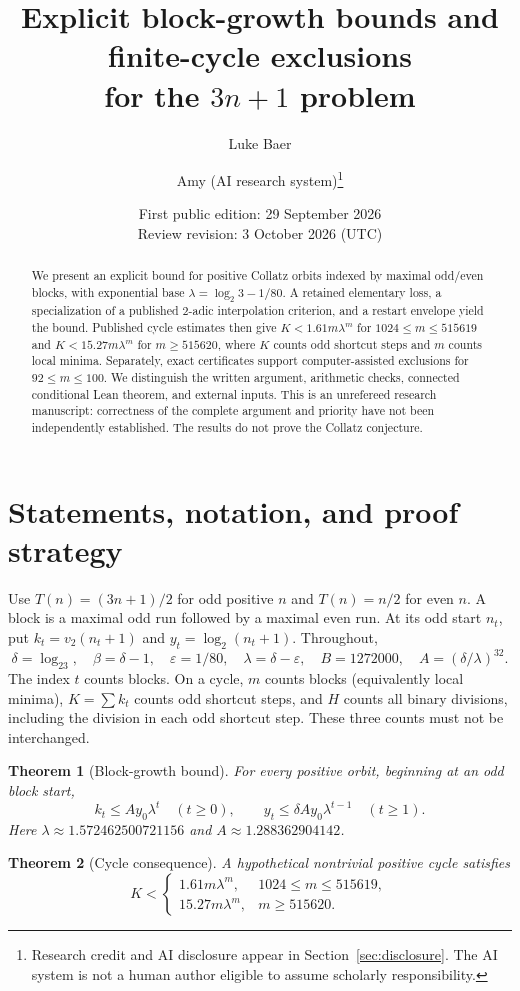 \documentclass[11pt]{article}
\title{Explicit block-growth bounds and finite-cycle exclusions\\for the $3n+1$ problem}
\author{Luke Baer \and Amy (AI research system)\thanks{Research credit and AI disclosure appear in Section~\ref{sec:disclosure}. The AI system is not a human author eligible to assume scholarly responsibility.}}
\date{First public edition: 29 September 2026\\Review revision: 3 October 2026 (UTC)}
\newtheorem{theorem}{Theorem}
\theoremstyle{definition}\newtheorem{definition}[theorem]{Definition}
\newcommand{\lb}{\log_2}
\newcommand{\eps}{\varepsilon}
\newcommand{\val}{v_2}
\begin{document}
\maketitle
\begin{abstract}
We present an explicit bound for positive Collatz orbits indexed by maximal odd/even blocks, with exponential base $\lambda=\log_2 3-1/80$. A retained elementary loss, a specialization of a published $2$-adic interpolation criterion, and a restart envelope yield the bound. Published cycle estimates then give $K<1.61m\lambda^m$ for $1024\le m\le515619$ and $K<15.27m\lambda^m$ for $m\ge515620$, where $K$ counts odd shortcut steps and $m$ counts local minima. Separately, exact certificates support computer-assisted exclusions for $92\le m\le100$. We distinguish the written argument, arithmetic checks, connected conditional Lean theorem, and external inputs. This is an unrefereed research manuscript: correctness of the complete argument and priority have not been independently established. The results do not prove the Collatz conjecture.
\end{abstract}

\section{Statements, notation, and proof strategy}
Use $T(n)=(3n+1)/2$ for odd positive $n$ and $T(n)=n/2$ for even $n$. A block is a maximal odd run followed by a maximal even run. At its odd start $n_t$, put $k_t=\val(n_t+1)$ and $y_t=\lb(n_t+1)$. Throughout,
\[
 \delta=\lb3,\quad \beta=\delta-1,\quad \eps=1/80,\quad
 \lambda=\delta-\eps,\quad B=1272000,\quad A=(\delta/\lambda)^{32}.
\]
The index $t$ counts blocks. On a cycle, $m$ counts blocks (equivalently local minima), $K=\sum k_t$ counts odd shortcut steps, and $H$ counts all binary divisions, including the division in each odd shortcut step. These three counts must not be interchanged.

\begin{theorem}[Block-growth bound]\label{thm:growth}
For every positive orbit, beginning at an odd block start,
\[
 k_t\le A y_0\lambda^t\quad(t\ge0),\qquad
 y_t\le\delta A y_0\lambda^{t-1}\quad(t\ge1).
\]
Here $\lambda\approx1.572462500721156$ and $A\approx1.288362904142$.
\end{theorem}

\begin{theorem}[Cycle consequence]\label{thm:cycle}
A hypothetical nontrivial positive cycle satisfies
\[
 K<\begin{cases}1.61m\lambda^m,&1024\le m\le515619,\\
 15.27m\lambda^m,&m\ge515620.
 \end{cases}
\]
\end{theorem}
\end{document}
